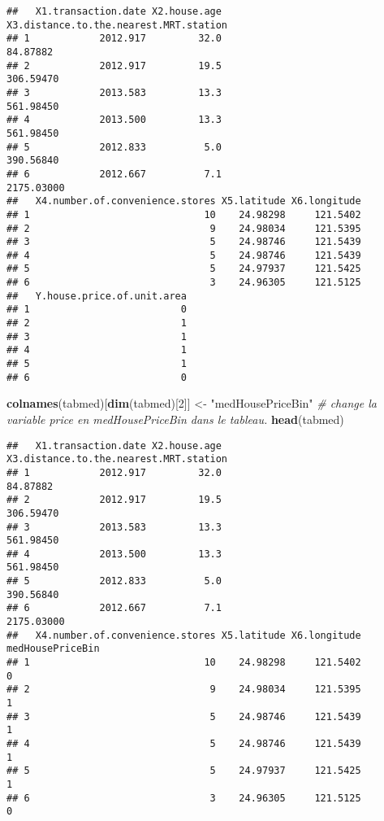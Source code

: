 \documentclass[
]{article}
\newenvironment{Shaded}{\begin{snugshade}}{\end{snugshade}}
\newcommand{\CommentTok}[1]{\textcolor[rgb]{0.56,0.35,0.01}{\textit{#1}}}
\newcommand{\DecValTok}[1]{\textcolor[rgb]{0.00,0.00,0.81}{#1}}
\newcommand{\KeywordTok}[1]{\textcolor[rgb]{0.13,0.29,0.53}{\textbf{#1}}}
\newcommand{\NormalTok}[1]{#1}
\newcommand{\StringTok}[1]{\textcolor[rgb]{0.31,0.60,0.02}{#1}}
\begin{document}
\begin{verbatim}
##   X1.transaction.date X2.house.age X3.distance.to.the.nearest.MRT.station
## 1            2012.917         32.0                               84.87882
## 2            2012.917         19.5                              306.59470
## 3            2013.583         13.3                              561.98450
## 4            2013.500         13.3                              561.98450
## 5            2012.833          5.0                              390.56840
## 6            2012.667          7.1                             2175.03000
##   X4.number.of.convenience.stores X5.latitude X6.longitude
## 1                              10    24.98298     121.5402
## 2                               9    24.98034     121.5395
## 3                               5    24.98746     121.5439
## 4                               5    24.98746     121.5439
## 5                               5    24.97937     121.5425
## 6                               3    24.96305     121.5125
##   Y.house.price.of.unit.area
## 1                          0
## 2                          1
## 3                          1
## 4                          1
## 5                          1
## 6                          0
\end{verbatim}

\begin{Shaded}
\begin{Highlighting}[]
\KeywordTok{colnames}\NormalTok{(tabmed)[}\KeywordTok{dim}\NormalTok{(tabmed)[}\DecValTok{2}\NormalTok{]] <-}\StringTok{ "medHousePriceBin"} \CommentTok{# change la variable price en medHousePriceBin dans le tableau.}
\KeywordTok{head}\NormalTok{(tabmed)}
\end{Highlighting}
\end{Shaded}

\begin{verbatim}
##   X1.transaction.date X2.house.age X3.distance.to.the.nearest.MRT.station
## 1            2012.917         32.0                               84.87882
## 2            2012.917         19.5                              306.59470
## 3            2013.583         13.3                              561.98450
## 4            2013.500         13.3                              561.98450
## 5            2012.833          5.0                              390.56840
## 6            2012.667          7.1                             2175.03000
##   X4.number.of.convenience.stores X5.latitude X6.longitude medHousePriceBin
## 1                              10    24.98298     121.5402                0
## 2                               9    24.98034     121.5395                1
## 3                               5    24.98746     121.5439                1
## 4                               5    24.98746     121.5439                1
## 5                               5    24.97937     121.5425                1
## 6                               3    24.96305     121.5125                0
\end{verbatim}
\end{document}
